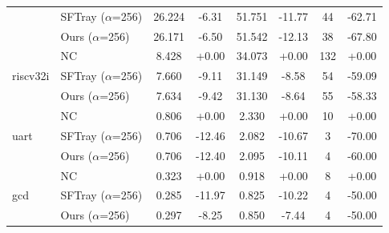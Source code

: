 \begin{table}[t]
{\begin{tabular}{llcccccc}
 & SFTray  ($\alpha$=256) & 26.224 & -6.31 & 51.751 & -11.77 & 44 & -62.71 \\
 & Ours  ($\alpha$=256) & 26.171 & -6.50 & 51.542 & -12.13 & 38 & -67.80 \\
\midrule
\multirow{3}{*}{riscv32i} & NC & 8.428 & +0.00 & 34.073 & +0.00 & 132 & +0.00 \\
 & SFTray  ($\alpha$=256) & 7.660 & -9.11 & 31.149 & -8.58 & 54 & -59.09 \\
 & Ours  ($\alpha$=256) & 7.634 & -9.42 & 31.130 & -8.64 & 55 & -58.33 \\
\midrule
\multirow{3}{*}{uart} & NC & 0.806 & +0.00 & 2.330 & +0.00 & 10 & +0.00 \\
 & SFTray  ($\alpha$=256) & 0.706 & -12.46 & 2.082 & -10.67 & 3 & -70.00 \\
 & Ours  ($\alpha$=256) & 0.706 & -12.40 & 2.095 & -10.11 & 4 & -60.00 \\
\midrule
\multirow{3}{*}{gcd} & NC & 0.323 & +0.00 & 0.918 & +0.00 & 8 & +0.00 \\
 & SFTray  ($\alpha$=256) & 0.285 & -11.97 & 0.825 & -10.22 & 4 & -50.00 \\
 & Ours  ($\alpha$=256) & 0.297 & -8.25 & 0.850 & -7.44 & 4 & -50.00 \\
\midrule
\bottomrule
\end{tabular}
}
\end{table}